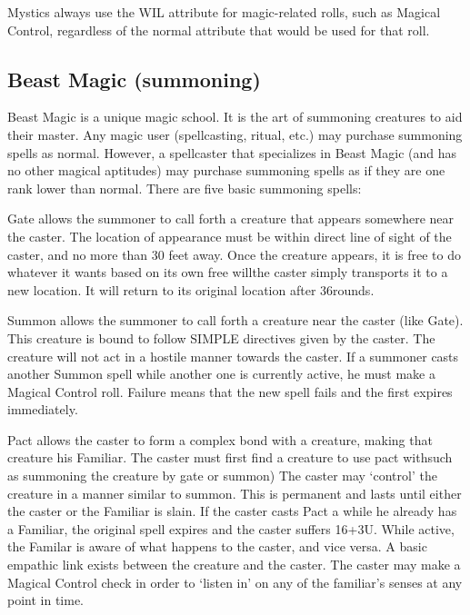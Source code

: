 \documentclass[twoside]{book}
\begin{document}
                  Mystics always use the WIL attribute for
                 magic-related rolls, such as Magical Control, regardless
                 of the normal attribute that would be used for that
                 roll. 
            
\subsection{Beast Magic (summoning)}
      Beast Magic is a unique magic school. It is the art
               of summoning creatures to aid their master. Any magic user
               (spellcasting, ritual, etc.) may purchase summoning spells
               as normal. However, a spellcaster that specializes in
               Beast Magic (and has no other magical aptitudes) may
               purchase summoning spells as if they are one rank lower
               than normal.   There are five basic summoning spells:   
              
                  Gate   allows the summoner
                  to call forth a creature that appears somewhere near
                  the caster. The location of appearance must be within
                  direct line of sight of the caster, and no more than 30
                  feet away. Once the creature appears, it is free to do
                  whatever it wants based on its own free willthe
                  caster simply transports it to a new location. It will
                  return to its original location after 36rounds.
                
              
                  Summon   allows the summoner
                  to call forth a creature near the caster (like Gate).
                  This creature is bound to follow SIMPLE directives
                  given by the caster. The creature will not act in a
                  hostile manner towards the caster. If a summoner casts
                  another Summon spell while another one is currently
                  active, he must make a Magical Control roll. Failure
                  means that the new spell fails and the first expires
                  immediately.
                
              
                  Pact   allows the caster to
                  form a complex bond with a creature, making that
                  creature his Familiar. The caster must first find a
                  creature to use pact withsuch as summoning the
                  creature by gate or summon) The caster may
                  `control' the creature in a manner similar
                  to summon. This is permanent and lasts until either the
                  caster or the Familiar is slain. If the caster casts
                  Pact a while he already has a Familiar, the original
                  spell expires and the caster suffers 16+3U. While
                  active, the Familar is aware of what happens to the
                  caster, and vice versa. A basic empathic link exists
                  between the creature and the caster. The caster may
                  make a Magical Control check in order to `listen
                  in' on any of the familiar's senses at any
                  point in time.
                
\end{document}
